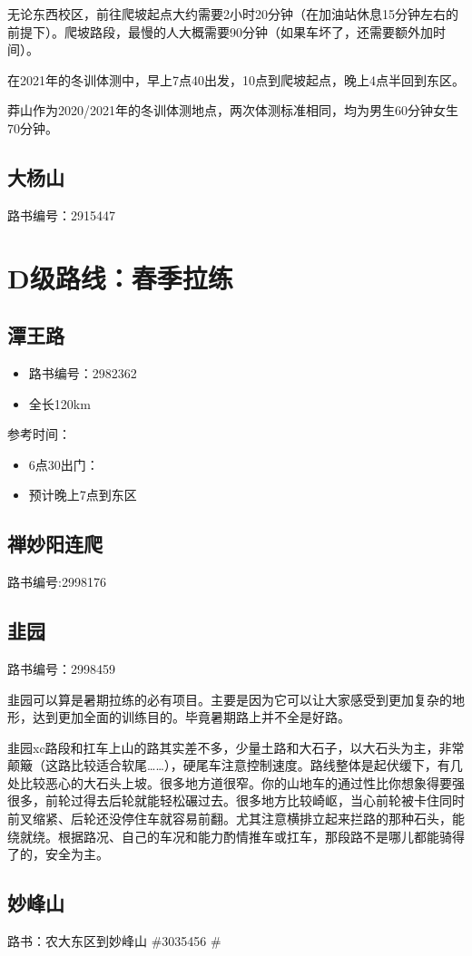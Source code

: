 \documentclass{ctexbook}
\begin{document}
无论东西校区，前往爬坡起点大约需要2小时20分钟（在加油站休息15分钟左右的前提下）。爬坡路段，最慢的人大概需要90分钟（如果车坏了，还需要额外加时间）。

在2021年的冬训体测中，早上7点40出发，10点到爬坡起点，晚上4点半回到东区。

莽山作为2020/2021年的冬训体测地点，两次体测标准相同，均为男生60分钟女生70分钟。

\newpage
\subsection{大杨山}
路书编号：2915447
\section{D级路线：春季拉练}
\subsection{潭王路}
\begin{itemize}
    \item 路书编号：2982362
    \item 全长120km
\end{itemize}
参考时间：
\begin{itemize}
    \item 6点30出门：
    \item 预计晚上7点到东区
\end{itemize}
\subsection{禅妙阳连爬}
路书编号:2998176
\subsection{韭园}
路书编号：2998459

韭园可以算是暑期拉练的必有项目。主要是因为它可以让大家感受到更加复杂的地形，达到更加全面的训练目的。毕竟暑期路上并不全是好路。

韭园xc路段和扛车上山的路其实差不多，少量土路和大石子，以大石头为主，非常颠簸（这路比较适合软尾……），硬尾车注意控制速度。路线整体是起伏缓下，有几处比较恶心的大石头上坡。很多地方道很窄。你的山地车的通过性比你想象得要强很多，前轮过得去后轮就能轻松碾过去。很多地方比较崎岖，当心前轮被卡住同时前叉缩紧、后轮还没停住车就容易前翻。尤其注意横排立起来拦路的那种石头，能绕就绕。根据路况、自己的车况和能力酌情推车或扛车，那段路不是哪儿都能骑得了的，安全为主。

\subsection{妙峰山}
\label{subsec:妙峰山}
路书：农大东区到妙峰山 \#3035456  \#
\end{document}
